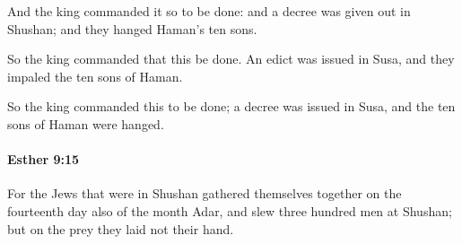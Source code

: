 			\begin{versebox}
					\item[BHS] 
					\item[LXX] 
					\item[ASV] And the king commanded it so to be done: and a decree was given out in Shushan; and they hanged Haman's ten sons.
					\item[NIV] So the king commanded that this be done. An edict was issued in Susa, and they impaled the ten sons of Haman.
					\item[NRSV] So the king commanded this to be done; a decree was issued in Susa, and the ten sons of Haman were hanged.
			\end{versebox}

		\paragraph{Esther 9:15} %
			\label{ESTHER-9-15}

			For the Jews that were in Shushan gathered themselves together on the fourteenth day also of the month Adar, and slew three hundred men at Shushan; but on the prey they laid not their hand.


